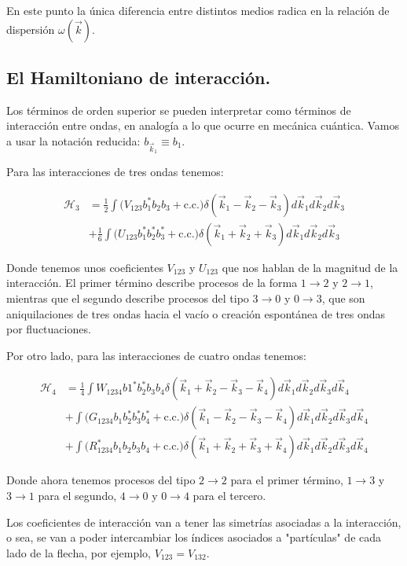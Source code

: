 En este punto la única diferencia entre distintos medios radica en la relación de dispersión $\omega(\vec k)$.

\subsection*{El Hamiltoniano de interacción.}
Los términos de orden superior se pueden interpretar como términos de interacción entre ondas, en analogía a lo que ocurre en mecánica cuántica. Vamos a usar la notación reducida: $b_{\vec k_1} \equiv b_1$.

Para las interacciones de tres ondas tenemos:

\begin{align}
	\mathcal{H}_3 &= \frac{1}{2}\int\big(V_{123}b^*_1b_2b_3+\text{c.c.}\big)\delta(\vec k_1-\vec k_2 -\vec k_3) d\vec k_1d\vec k_2d\vec k_3 \\ &+ \frac{1}{6} \int\big(U_{123}b^*_1b^*_2b^*_3+\text{c.c.}\big)\delta(\vec k_1 + \vec k_2 + \vec k_3) d\vec k_1d\vec k_2d\vec k_3
\end{align} 

Donde tenemos unos coeficientes $V_{123}$ y $U_{123}$ que nos hablan de la magnitud de la interacción. El primer término describe procesos de la forma $1\rightarrow2$ y  $2\rightarrow1$, mientras que el segundo describe procesos del tipo $3\rightarrow0$ y $0\rightarrow3$, que son aniquilaciones de tres ondas hacia el vacío o creación espontánea de tres ondas por fluctuaciones. %

Por otro lado, para las interacciones de cuatro ondas tenemos:

\begin{align}
	\mathcal{H}_4 &= \frac{1}{4} \int W_{1234}b1^*b_2^*b_3b_4\delta(\vec k_1+\vec k_2-\vec k_3-\vec k_4) d\vec k_1d\vec k_2d\vec k_3d\vec k_4 \\
	&+\int \big(G_{1234}b_1b_2^*b_3^*b_4^* + \text{c.c.}\big) \delta(\vec k_1-\vec k_2-\vec k_3-\vec k_4) d\vec k_1d\vec k_2d\vec k_3d\vec k_4 \\
	&+\int \big(R^*_{1234}b_1b_2b_3b_4 + \text{c.c.}\big) \delta(\vec k_1+\vec k_2+\vec k_3+\vec k_4) d\vec k_1d\vec k_2d\vec k_3d\vec k_4
\end{align}

Donde ahora tenemos procesos del tipo $2\rightarrow2$ para el primer término, $1\rightarrow3$ y $3\rightarrow1$ para el segundo, $4\rightarrow0$ y $0\rightarrow4$ para el tercero.
 
Los coeficientes de interacción van a tener las simetrías asociadas a la interacción, o sea, se van a poder intercambiar los índices asociados a "partículas" de cada lado de la flecha, por ejemplo, $V_{123}=V_{132}$.

